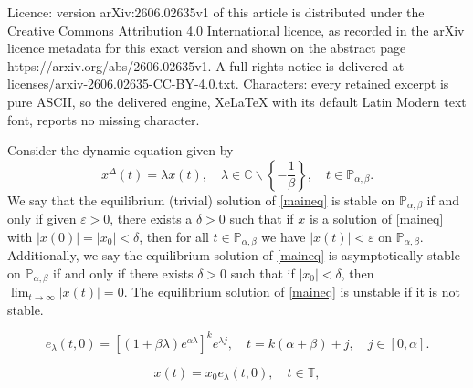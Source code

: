 \documentclass[10pt,a4paper]{amsart}
\newcommand{\C}{\ensuremath{\mathbb{C}}}
\newcommand{\T}{\ensuremath{\mathbb{T}}}
\newcommand{\p}{\ensuremath{\mathbb{P}}}
\begin{document}
Licence: version arXiv:2606.02635v1 of this article is distributed under the Creative Commons Attribution 4.0 International licence, as recorded in the arXiv licence metadata for this exact version and shown on the abstract page https://arxiv.org/abs/2606.02635v1. A full rights notice is delivered at licenses/arxiv-2606.02635-CC-BY-4.0.txt. Characters: every retained excerpt is pure ASCII, so the delivered engine, XeLaTeX with its default Latin Modern text font, reports no missing character.
\begin{definition}
Consider the dynamic equation given by
\begin{equation}\label{maineq}
 x^\Delta(t) = \lambda x(t), \quad \lambda\in\C\backslash\left\{-\frac{1}{\beta}\right\}, \quad t\in\p_{\alpha,\beta}.
\end{equation}
We say that the equilibrium (trivial) solution of \eqref{maineq} is stable on $\p_{\alpha,\beta}$ if and only if given $\varepsilon>0$, there exists a $\delta>0$ such that if $x$ is a solution of \eqref{maineq} with $|x(0)|=|x_0|<\delta$, then for all $t\in\p_{\alpha,\beta}$ we have $|x(t)|<\varepsilon$ on $\p_{\alpha,\beta}$. Additionally, we say the equilibrium solution of \eqref{maineq} is asymptotically stable on $\p_{\alpha,\beta}$ if and only if there exists $\delta>0$ such that if $|x_0|<\delta$, then $\displaystyle\lim_{t\rightarrow\infty} |x(t)|=0$. The equilibrium solution of \eqref{maineq} is unstable if it is not stable.
\end{definition}

\begin{equation}\label{pabexp0} 
 e_{\lambda}(t,0)=\left[(1+\beta\lambda)e^{\alpha\lambda}\right]^{k}e^{\lambda j}, \quad t=k(\alpha+\beta)+j, \quad j\in[0,\alpha]. 
\end{equation}

\begin{equation}\label{xform}
 x(t)=x_0e_{\lambda}(t,0), \quad t\in\T,
\end{equation}
\end{document}
